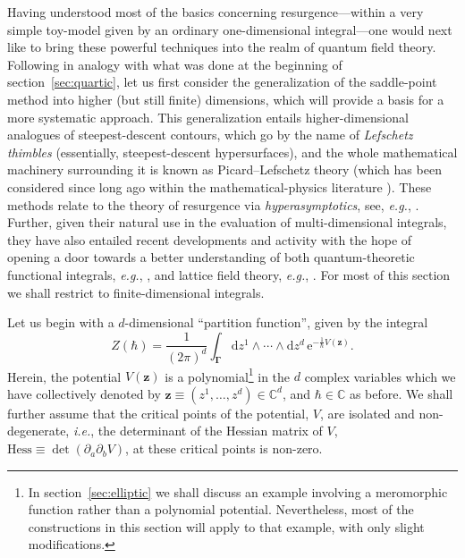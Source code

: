 \documentclass[11pt,a4paper]{article}
\def\BC{{\mathbb C}}
\newcommand{\be}{\begin{equation}}
\newcommand{\ee}{\end{equation}}
\newcommand{\rme}{{\mathrm{e}}}
\newcommand{\rmd}{{\mathrm{d}}}
\begin{document}
Having understood most of the basics concerning resurgence---within a very simple toy-model given by an ordinary one-dimensional integral---one would next like to bring these powerful techniques into the realm of quantum field theory. Following in analogy with what was done at the beginning of section~\ref{sec:quartic}, let us first consider the generalization of the saddle-point method into higher (but still finite) dimensions, which will provide a basis for a more systematic approach. This generalization entails higher-dimensional analogues of steepest-descent contours, which go by the name of \textit{Lefschetz thimbles} (essentially, steepest-descent hypersurfaces), and the whole mathematical machinery surrounding it is known as Picard--Lefschetz theory (which has been considered since long ago within the mathematical-physics literature \cite{p83, f77, dh02}). These methods relate to the theory of resurgence via \textit{hyperasymptotics}, see, \textit{e.g.}, \cite{bh90, bh91, b91, h97, b99, hlo04, o04, chko07}. Further, given their natural use in the evaluation of multi-dimensional integrals, they have also entailed recent developments and activity with the hope of opening a door towards a better understanding of both quantum-theoretic functional integrals, \textit{e.g.}, \cite{w10a, w10b, hmw11, cdu14, tk14, t14, kt14, bssu15, tnk15, bpsu15, ft15, du15b, tnv17}, and lattice field theory, \textit{e.g.}, \cite{cdms13, mcs13, fhkkks13, abb15, abbrw15, abbvw16, abbrw16, ns17}. For most of this section we shall restrict to finite-dimensional integrals.

Let us begin with a $d$-dimensional ``partition function'', given by the integral
%
\be
\label{eq:nd_integral}
Z (\hbar) = \frac{1}{\left( 2\pi \right)^d} \int_{\boldsymbol{\Gamma}} \rmd z^1 \wedge \cdots \wedge \rmd z^d\, \rme^{- \frac{1}{\hbar} V(\boldsymbol{z})}.
\ee
%
\noindent
Herein, the potential $V(\boldsymbol{z})$ is a polynomial\footnote{In section~\ref{sec:elliptic} we shall discuss an example involving a meromorphic function rather than a polynomial potential. Nevertheless, most of the constructions in this section will apply to that example, with only slight modifications.} in the $d$ complex variables which we have collectively denoted by $\boldsymbol{z} \equiv ( z^1, \ldots, z^d ) \in \BC^d$, and $\hbar \in \BC$ as before. We shall further assume that the critical points of the potential, $V$, are isolated and non-degenerate, \textit{i.e.}, the  determinant of the Hessian matrix of $V$, $\text{Hess} \equiv \det (\partial_a\partial_b V)$, at these critical points is non-zero.
\end{document}
